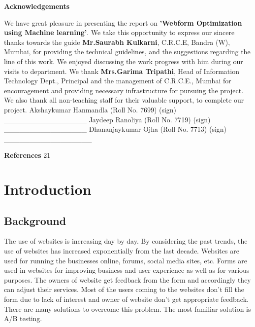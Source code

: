 \documentclass[12pt]{report}
\begin{document}
\newpage
\begin{center}
\begin{Huge}
\textbf{ Acknowledgements }
\end{Huge}
\end{center}
\vspace*{50px}
We have great pleasure in presenting the report on \textbf{'Webform Optimization using Machine learning'}. We take this opportunity to express our sincere thanks towards the guide \textbf{Mr.Saurabh Kulkarni}, C.R.C.E, Bandra (W), Mumbai, for providing the technical guidelines, and the suggestions regarding the line of this work. We enjoyed discussing the work progress with him during our visits to department.
\newline
\newline
We thank \textbf{Mrs.Garima Tripathi}, Head of Information Technology Dept., Principal and the management of C.R.C.E., Mumbai for encouragement and providing necessary infrastructure for pursuing the project.
\newline
\newline
We also thank all non-teaching staff for their valuable support, to complete our project.
\vspace*{100px}
\hspace*{240px}
\newline 
\hspace*{160px}
Akshaykumar Hanmandla (Roll No. 7699) (sign) \_\_\_\_\_\_\_\_\_\_\_\_\_\_\_\_
\newline 
\hspace*{160px} 
Jaydeep Ranoliya    (Roll No. 7719) (sign) 
\hspace*{40px} 
\_\_\_\_\_\_\_\_\_\_\_\_\_\_\_\_
\newline 
\hspace*{160px} 
 Dhananjaykumar Ojha   (Roll No.  7713) (sign) 
\hspace*{11px} 
\_\_\_\_\_\_\_\_\_\_\_\_\_\_\_\_\_
\newpage
\tableofcontents
\listoffigures
\vspace*{10px}
\textbf{ References }
\hspace*{360px}21
\newpage
\chapter{Introduction}
\section{Background}
The use of websites is increasing day by day. By considering the past trends, the use of websites has increased exponentially from the last decade. Websites are used for running the businesses online, forums, social media sites, etc. Forms are used in websites for improving business and user experience as well as for various purposes. The owners of website get feedback from the form and accordingly they can adjust their services. Most of the users coming to the websites don’t fill the form due to lack of interest and owner of website don’t get appropriate feedback. There are many solutions to overcome this problem. The most familiar solution is A/B testing.
\end{document}
